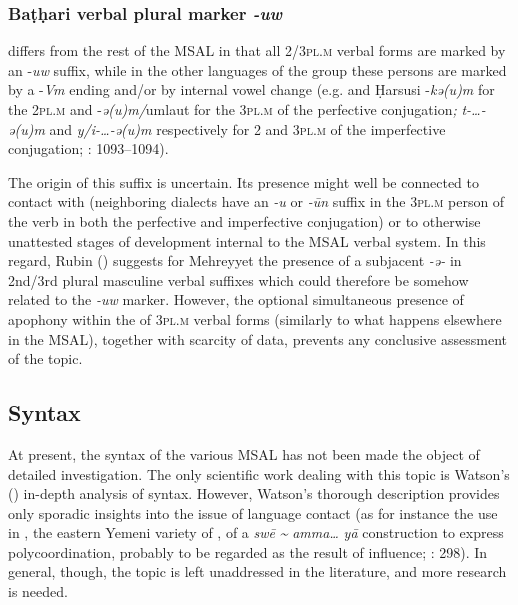\documentclass[output=paper]{langsci/langscibook}
\begin{document}
 \subsubsection{Baṭḥari verbal plural marker \textit{{}-uw}} 

 differs from the rest of the MSAL in that all 2/\textsc{3pl.m} verbal forms are marked by an -\textit{uw} suffix, while in the other languages of the group these persons are marked by a -\textit{Vm} ending and/or by internal vowel change (e.g.  and Ḥarsusi -\textit{kə(u)m} for the \textsc{2pl.m} and -\textit{ə(u)m/}umlaut for the \textsc{3pl.m} of the perfective conjugation\textit{;} \textit{t-…-ə(u)m} and \textit{y/i-…-ə(u)m} respectively for 2 and \textsc{3pl.m} of the imperfective conjugation; \citealt{Simeone-Senelle2011}: 1093--1094). 

The origin of this suffix is uncertain. Its presence might well be connected to contact with  (neighboring dialects have an \textit{{}-u} or \textit{{}-}\textit{ūn} suffix in the \textsc{3pl.m} person of the verb in both the perfective and imperfective conjugation) or to otherwise unattested stages of development internal to the MSAL verbal system. In this regard, Rubin (\citeyear[5]{Rubin2017}) suggests for {Mehreyyet} the presence of a subjacent \textit{{}-ə{}-} in 2nd/3rd plural masculine verbal suffixes which could therefore be somehow related to the  \textit{{}-uw} marker. However, the optional simultaneous presence of apophony within the  of \textsc{3pl.m} verbal forms (similarly to what happens elsewhere in the MSAL), together with scarcity of data, prevents any conclusive assessment of the topic.


 
 \subsection{Syntax}\label{sec:key:syn}


At present, the syntax of the various MSAL has not been made the object of detailed investigation. The only scientific work dealing with this topic is Watson's (\citeyear{Watson2012}) in-depth analysis of  syntax. However, Watson’s thorough description provides only sporadic insights into the issue of language contact (as for instance the use in , the {eastern} Yemeni variety of , of a \textit{swē} \textit{{\textasciitilde}} \textit{amma…} \textit{yā} construction to express polycoordination, probably to be regarded as the result of  influence; \citealt{Watson2012}: 298). In general, though, the topic is left unaddressed in the literature, and more research is needed.
\end{document}
